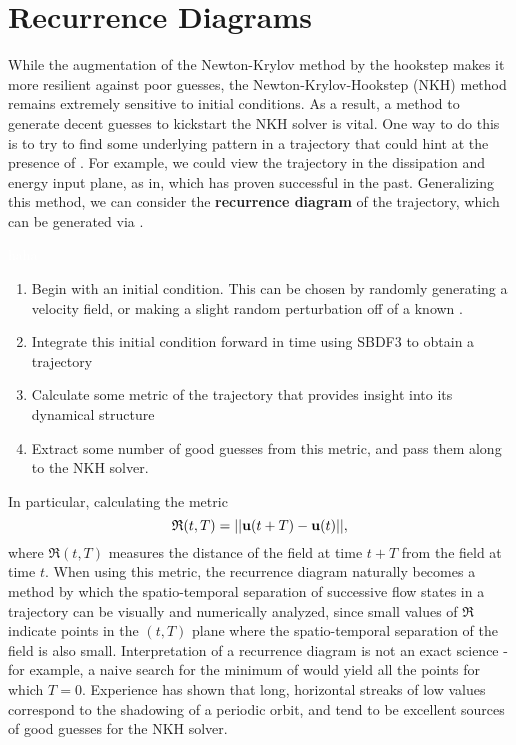  \section{Recurrence Diagrams}
 
 While the augmentation of the Newton-Krylov method by the hookstep makes it more resilient against poor guesses, the Newton-Krylov-Hookstep (NKH) method remains extremely sensitive to initial conditions. As a result, a method to generate decent guesses to kickstart the NKH solver is vital. One way to do this is to try to find some underlying pattern in a trajectory that could hint at the presence of \ecs. For example, we could view the trajectory in the dissipation and energy input plane, as in, which has proven successful in the past. Generalizing this method, we can consider the {\bf recurrence diagram} of the trajectory, which can be generated via . \\
 
  \begin{algorithm}\label{alg:rec}
  \textcolor{white}{haha}
 \begin{enumerate}
 \item Begin with an initial condition. This can be chosen by randomly generating a velocity field, or making a slight random perturbation off of a known \ecs.
 \item Integrate this initial condition forward in time using SBDF3 to obtain a trajectory 
 \item Calculate some metric of the trajectory that provides insight into its dynamical structure
 \item Extract some number of good guesses from this metric, and pass them along to the NKH solver.
 \end{enumerate}
 \end{algorithm} 
In particular, calculating the metric  
\begin{equation}\label{eq:recurrenceEQ}
 \mathfrak{R}(t,T) = ||\mathbf{u}(t+T) - \mathbf{u}(t)||,
 \end{equation}
where $\mathfrak{R}(t,T)$ measures the distance of the field at time $t+T$ from the field at time $t$. When using this metric, the recurrence diagram naturally becomes a method by which the spatio-temporal separation of successive flow states in a trajectory can be visually and numerically analyzed, since small values of $\mathfrak{R}$ indicate points in the $(t,T)$ plane where the spatio-temporal separation of the field is also small. Interpretation of a recurrence diagram is not an exact science - for example, a naive search for the minimum of  would yield all the points for which $T=0$. Experience has shown that long, horizontal streaks of low values correspond to the shadowing of a periodic orbit, and tend to be excellent sources of good guesses for the NKH solver. \\
 
